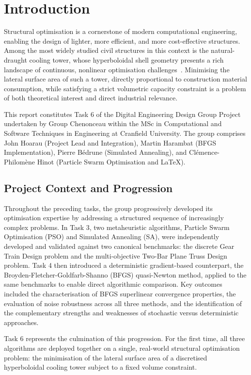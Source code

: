 \section{Introduction}

Structural optimisation is a cornerstone of modern computational engineering, enabling the design of lighter, more efficient, and more cost-effective structures. 
Among the most widely studied civil structures in this context is the natural-draught cooling tower, whose hyperboloidal shell geometry presents a rich landscape of continuous, nonlinear optimisation challenges~\cite{mungan1976buckling}. 
Minimising the lateral surface area of such a tower, directly proportional to construction material consumption, while satisfying a strict volumetric capacity constraint is a problem of both theoretical interest and direct industrial relevance.

This report constitutes Task 6 of the Digital Engineering Design Group Project undertaken by Group Chenonceau within the MSc in Computational and Software Techniques in Engineering at Cranfield University. 
The group comprises John Hoarau (Project Lead and Integration), Martin Harambat (BFGS Implementation), Pierre B\'{e}drune (Simulated Annealing), and Cl\'{e}mence-Philom\`{e}ne Hinot (Particle Swarm Optimisation and \LaTeX).

\subsection{Project Context and Progression}

Throughout the preceding tasks, the group progressively developed its optimisation expertise by addressing a structured sequence of increasingly complex problems. 
In Task 3, two metaheuristic algorithms, Particle Swarm Optimisation (PSO) and Simulated Annealing (SA), were independently developed and validated against
 two canonical benchmarks: the discrete Gear Train Design problem and the multi-objective Two-Bar Plane Truss Design problem. 
Task 4 then introduced a deterministic gradient-based counterpart, the Broyden-Fletcher-Goldfarb-Shanno (BFGS) quasi-Newton method, applied to the same benchmarks to
 enable direct algorithmic comparison. 
Key outcomes included the characterisation of BFGS superlinear convergence properties, the evaluation of noise robustness across all three methods, and the identification 
of the complementary strengths and weaknesses of stochastic versus deterministic approaches.

Task 6 represents the culmination of this progression. For the first time, all three algorithms are deployed together on a single, real-world structural optimisation problem: the minimisation of the lateral surface area of a discretised hyperboloidal cooling tower subject to a fixed volume constraint.

